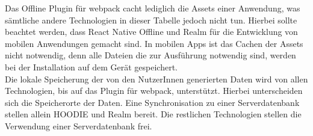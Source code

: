 %
%
%
Das Offline Plugin für webpack cacht lediglich die \gls{Assets} einer Anwendung, was sämtliche andere Technologien in dieser Tabelle jedoch nicht tun.
Hierbei sollte beachtet werden, dass React Native Offline und Realm für die Entwicklung von mobilen Anwendungen gemacht sind.
In mobilen \glspl{App} ist das Cachen der \gls{Assets} nicht notwendig, denn alle Dateien die zur Ausführung notwendig sind, werden bei der Installation auf dem Gerät gespeichert.\\
Die lokale Speicherung der von den NutzerInnen generierten Daten wird von allen Technologien, bis auf das Plugin für webpack, unterstützt.
Hierbei unterscheiden sich die Speicherorte der Daten.
Eine Synchronisation zu einer Serverdatenbank stellen allein HOODIE und Realm bereit.
Die restlichen Technologien stellen die Verwendung einer Serverdatenbank frei.